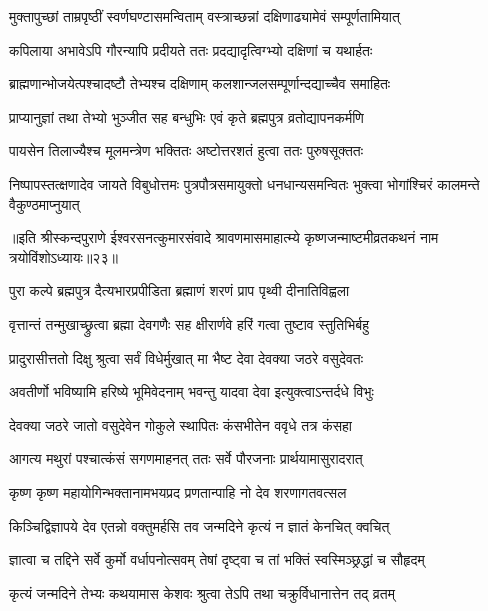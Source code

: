 \twolineshloka
{मुक्तापुच्छां ताम्रपृष्ठीं स्वर्णघण्टासमन्विताम्}
{वस्त्राच्छन्नां दक्षिणाढ्यामेवं सम्पूर्णतामियात्} %

\twolineshloka
{कपिलाया अभावेऽपि गौरन्यापि प्रदीयते}
{ततः प्रदद्यादृत्विग्भ्यो दक्षिणां च यथार्हतः} %

\twolineshloka
{ब्राह्मणान्भोजयेत्पश्चादष्टौ तेभ्यश्च दक्षिणाम्}
{कलशान्जलसम्पूर्णान्दद्याच्चैव समाहितः} %

\twolineshloka
{प्राप्यानुज्ञां तथा तेभ्यो भुञ्जीत सह बन्धुभिः}
{एवं कृते ब्रह्मपुत्र व्रतोद्यापनकर्मणि} %

\twolineshloka
{पायसेन तिलाज्यैश्च मूलमन्त्रेण भक्तितः}
{अष्टोत्तरशतं हुत्वा ततः पुरुषसूक्ततः} %


\threelineshloka
{निष्पापस्तत्क्षणादेव जायते विबुधोत्तमः}
{पुत्रपौत्रसमायुक्तो धनधान्यसमन्वितः}
{भुक्त्वा भोगांश्चिरं कालमन्ते वैकुण्ठमाप्नुयात्} %


{॥इति श्रीस्कन्दपुराणे ईश्वरसनत्कुमारसंवादे श्रावणमासमाहात्म्ये कृष्णजन्माष्टमीव्रतकथनं नाम त्रयोविंशोऽध्यायः॥२३॥}





\twolineshloka
{पुरा कल्पे ब्रह्मपुत्र दैत्यभारप्रपीडिता}
{ब्रह्माणं शरणं प्राप पृथ्वी दीनातिविह्वला} %

\twolineshloka
{वृत्तान्तं तन्मुखाच्छ्रुत्वा ब्रह्मा देवगणैः सह}
{क्षीरार्णवे हरिं गत्वा तुष्टाव स्तुतिभिर्बहु} %

\twolineshloka
{प्रादुरासीत्ततो दिक्षु श्रुत्वा सर्वं विधेर्मुखात्}
{मा भैष्ट देवा देवक्या जठरे वसुदेवतः} %

\twolineshloka
{अवतीर्णो भविष्यामि हरिष्ये भूमिवेदनाम्}
{भवन्तु यादवा देवा इत्युक्त्वाऽन्तर्दधे विभुः} %

\twolineshloka
{देवक्या जठरे जातो वसुदेवेन गोकुले}
{स्थापितः कंसभीतेन ववृधे तत्र कंसहा} %

\twolineshloka
{आगत्य मथुरां पश्चात्कंसं सगणमाहनत्}
{ततः सर्वे पौरजनाः प्रार्थयामासुरादरात्} %

\twolineshloka
{कृष्ण कृष्ण महायोगिन्भक्तानामभयप्रद}
{प्रणतान्पाहि नो देव शरणागतवत्सल} %

\twolineshloka
{किञ्चिद्विज्ञापये देव एतन्नो वक्तुमर्हसि}
{तव जन्मदिने कृत्यं न ज्ञातं केनचित् क्वचित्} %

\twolineshloka
{ज्ञात्वा च तद्दिने सर्वे कुर्मो वर्धापनोत्सवम्}
{तेषां दृष्ट्वा च तां भक्तिं स्वस्मिञ्छ्रद्धां च सौहृदम्} %

\twolineshloka
{कृत्यं जन्मदिने तेभ्यः कथयामास केशवः}
{श्रुत्वा तेऽपि तथा चक्रुर्विधानात्तेन तद् व्रतम्} %

